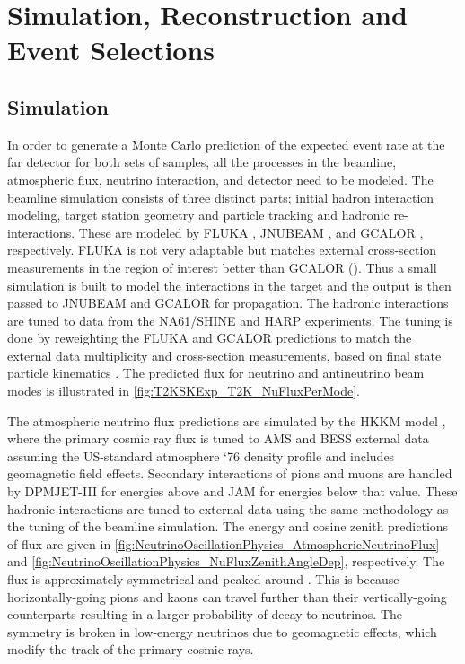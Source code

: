 \chapter{Simulation, Reconstruction and Event Selections}
\label{chap:Selections}

\section{Simulation}
\label{sec:Selections_Simulation}

In order to generate a Monte Carlo prediction of the expected event rate at the far detector for both sets of samples, all the processes in the beamline, atmospheric flux, neutrino interaction, and detector need to be modeled. The beamline simulation consists of three distinct parts; initial hadron interaction modeling, target station geometry and particle tracking and hadronic re-interactions. These are modeled by FLUKA \cite{fluka2011}, JNUBEAM \cite{geant3, PhysRevD.87.012001}, and GCALOR \cite{gcalor}, respectively. FLUKA is not very adaptable but matches external cross-section measurements in the region of interest better than GCALOR (). Thus a small simulation is built to model the interactions in the target and the output is then passed to JNUBEAM and GCALOR for propagation. The hadronic interactions are tuned to data from the NA61/SHINE \cite{Abgrall_2011, Abgrall_2012, NA61_pions_rep} and HARP \cite{harp} experiments. The tuning is done by reweighting the FLUKA and GCALOR predictions to match the external data multiplicity and cross-section measurements, based on final state particle kinematics \cite{t2k_tn_flux}. The predicted flux for neutrino and antineutrino beam modes is illustrated in \autoref{fig:T2KSKExp_T2K_NuFluxPerMode}.

The atmospheric neutrino flux predictions are simulated by the HKKM model \cite{Honda_2007, Honda:2011}, where the primary cosmic ray flux is tuned to AMS \cite{Blau2002} and BESS \cite{Haino2004} external data assuming the US-standard atmosphere `76 \cite{USStandardAtm} density profile and includes geomagnetic field effects. Secondary interactions of pions and muons are handled by DPMJET-III \cite{Roesler2001} for energies above  and JAM \cite{Niita2006, Honda:2011} for energies below that value. These hadronic interactions are tuned to external data \cite{Sanuki_2002, Achard_2004} using the same methodology as the tuning of the beamline simulation. The energy and cosine zenith predictions of  flux are given in \autoref{fig:NeutrinoOscillationPhysics_AtmosphericNeutrinoFlux} and \autoref{fig:NeutrinoOscillationPhysics_NuFluxZenithAngleDep}, respectively. The flux is approximately symmetrical and peaked around . This is because horizontally-going pions and kaons can travel further than their vertically-going counterparts resulting in a larger probability of decay to neutrinos. The symmetry is broken in low-energy neutrinos due to geomagnetic effects, which modify the track of the primary cosmic rays.

